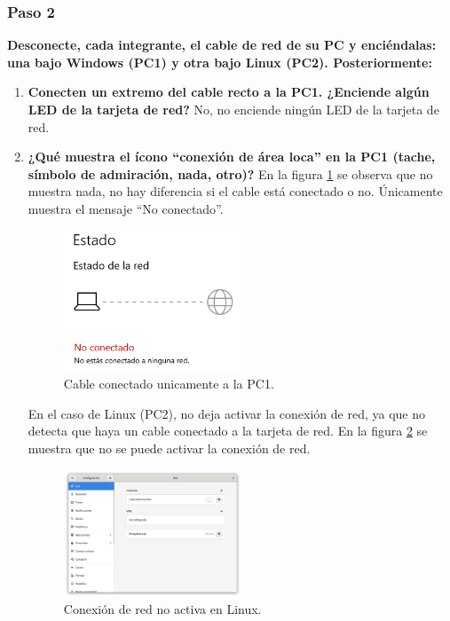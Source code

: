         \subsubsection*{Paso 2}
        \textbf{Desconecte, cada integrante, el cable de red de su PC y enciéndalas: una bajo Windows (PC1) y otra bajo Linux (PC2). Posteriormente:}

        \begin{enumerate}
            \item \textbf{Conecten un extremo del cable recto a la PC1. ¿Enciende algún LED de la tarjeta de red?}
            No, no enciende ningún LED de la tarjeta de red.
            \item \textbf{¿Qué muestra el ícono ``conexión de área loca'' en la PC1 (tache, símbolo de admiración, nada, otro)?}
            En la figura \ref{fig:cable_conectado} se observa que no muestra nada, no hay diferencia si el cable está conectado o no. Únicamente muestra el mensaje ``No conectado''.
            \begin{figure}[H]
                \centering
                \includegraphics[width=0.5\textwidth]{img/cable_conectado.png}
                \caption{Cable conectado unicamente a la PC1.}
                \label{fig:cable_conectado}
            \end{figure}

            En el caso de Linux (PC2), no deja activar la conexión de red, ya que no detecta que haya un cable conectado a la tarjeta de red. En la figura \ref{fig:conexion_no_activa} se muestra que no se puede activar la conexión de red.

            \begin{figure}[H]
                \centering
                \includegraphics[width=0.5\textwidth]{img/Cable_desconectado_linux.png}
                \caption{Conexión de red no activa en Linux.}
                \label{fig:conexion_no_activa}
            \end{figure}


\end{enumerate}
